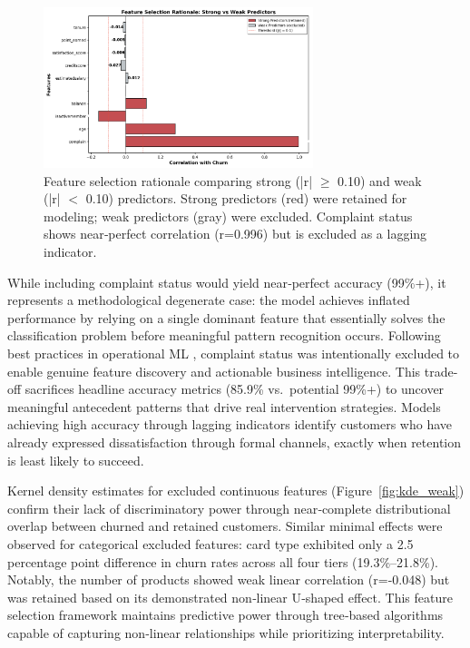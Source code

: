 \documentclass[12pt]{article}
\begin{document}
\begin{figure}[H]
\centering
\includegraphics[width=0.7\textwidth]{../img/feature_selection_comparison.png}
\caption{Feature selection rationale comparing strong (|r| $\geq$ 0.10) and weak (|r| $<$ 0.10) predictors. Strong predictors (red) were retained for modeling; weak predictors (gray) were excluded. Complaint status shows near‑perfect correlation (r=0.996) but is excluded as a lagging indicator.}
\label{fig:feature_selection}
\end{figure}

While including complaint status would yield near‑perfect accuracy (99\%+), it represents a methodological degenerate case: the model achieves inflated performance by relying on a single dominant feature that essentially solves the classification problem before meaningful pattern recognition occurs. Following best practices in operational ML \citep{kumar2022customerretention}, complaint status was intentionally excluded to enable genuine feature discovery and actionable business intelligence. This trade-off sacrifices headline accuracy metrics (85.9\% vs.\ potential 99\%+) to uncover meaningful antecedent patterns that drive real intervention strategies. Models achieving high accuracy through lagging indicators identify customers who have already expressed dissatisfaction through formal channels, exactly when retention is least likely to succeed.

Kernel density estimates for excluded continuous features (Figure~\ref{fig:kde_weak}) confirm their lack of discriminatory power through near‑complete distributional overlap between churned and retained customers. Similar minimal effects were observed for categorical excluded features: card type exhibited only a 2.5 percentage point difference in churn rates across all four tiers (19.3\%–21.8\%). Notably, the number of products showed weak linear correlation (r=-0.048) but was retained based on its demonstrated non‑linear U‑shaped effect. This feature selection framework maintains predictive power through tree‑based algorithms capable of capturing non‑linear relationships while prioritizing interpretability.
\end{document}
